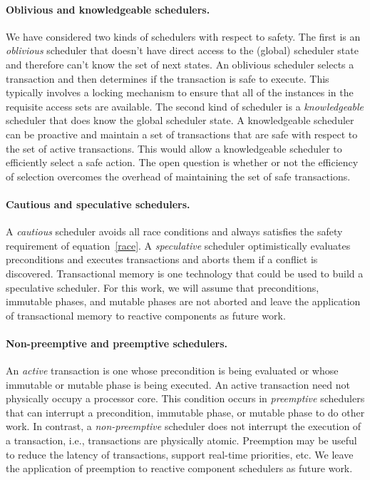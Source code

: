 \paragraph{Oblivious and knowledgeable schedulers.}
We have considered two kinds of schedulers with respect to safety.
The first is an \emph{oblivious} scheduler that doesn't have direct access to the (global) scheduler state and therefore can't know the set of next states.
An oblivious scheduler selects a transaction and then determines if the transaction is safe to execute.
This typically involves a locking mechanism to ensure that all of the instances in the requisite access sets are available.
The second kind of scheduler is a \emph{knowledgeable} scheduler that does know the global scheduler state.
A knowledgeable scheduler can be proactive and maintain a set of transactions that are safe with respect to the set of active transactions.
This would allow a knowledgeable scheduler to efficiently select a safe action.
The open question is whether or not the efficiency of selection overcomes the overhead of maintaining the set of safe transactions.

\paragraph{Cautious and speculative schedulers.}
A \emph{cautious} scheduler avoids all race conditions and always satisfies the safety requirement of equation~\ref{race}.
A \emph{speculative} scheduler optimistically evaluates preconditions and executes transactions and aborts them if a conflict is discovered.
Transactional memory is one technology that could be used to build a speculative scheduler.
For this work, we will assume that preconditions, immutable phases, and mutable phases are not aborted and leave the application of transactional memory to reactive components as future work.

\paragraph{Non-preemptive and preemptive schedulers.}
An \emph{active} transaction is one whose precondition is being evaluated or whose immutable or mutable phase is being executed.
An active transaction need not physically occupy a processor core.
This condition occurs in \emph{preemptive} schedulers that can interrupt a precondition, immutable phase, or mutable phase to do other work.
In contrast, a \emph{non-preemptive} scheduler does not interrupt the execution of a transaction, i.e., transactions are physically atomic.
Preemption may be useful to reduce the latency of transactions, support real-time priorities, etc.
We leave the application of preemption to reactive component schedulers as future work.

